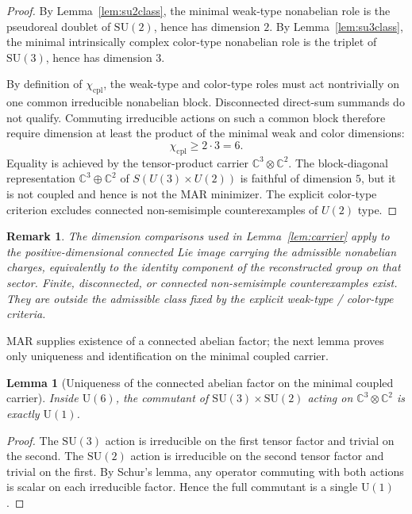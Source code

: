 \documentclass[11pt]{article}
\newtheorem{lemma}[theorem]{Lemma}
\newtheorem{remark}[theorem]{Remark}
\newcommand{\SU}{\mathrm{SU}}
\newcommand{\U}{\mathrm{U}}
\begin{document}
\begin{proof}
By Lemma~\ref{lem:su2class}, the minimal weak-type nonabelian role is the pseudoreal doublet of $\SU(2)$, hence has dimension $2$. By Lemma~\ref{lem:su3class}, the minimal intrinsically complex color-type nonabelian role is the triplet of $\SU(3)$, hence has dimension $3$.

By definition of $\chi_{\mathrm{cpl}}$, the weak-type and color-type roles must act nontrivially on one common irreducible nonabelian block. Disconnected direct-sum summands do not qualify. Commuting irreducible actions on such a common block therefore require dimension at least the product of the minimal weak and color dimensions:
\[
\chi_{\mathrm{cpl}}\ge 2\cdot 3=6.
\]
Equality is achieved by the tensor-product carrier $\mathbb C^3\otimes\mathbb C^2$. The block-diagonal representation $\mathbb C^3\oplus \mathbb C^2$ of $S(U(3)\times U(2))$ is faithful of dimension $5$, but it is not coupled and hence is not the MAR minimizer. The explicit color-type criterion excludes connected non-semisimple counterexamples of $U(2)$ type.
\end{proof}

\begin{remark}\label{rem:connectedlie}
The dimension comparisons used in Lemma~\ref{lem:carrier} apply to the positive-dimensional connected Lie image carrying the admissible nonabelian charges, equivalently to the identity component of the reconstructed group on that sector. Finite, disconnected, or connected non-semisimple counterexamples exist. They are outside the admissible class fixed by the explicit weak-type / color-type criteria.
\end{remark}

MAR supplies existence of a connected abelian factor; the next lemma proves only uniqueness and identification on the minimal coupled carrier.

\begin{lemma}[Uniqueness of the connected abelian factor on the minimal coupled carrier]\label{lem:commutant}
Inside $\U(6)$, the commutant of $\SU(3)\times\SU(2)$ acting on $\mathbb C^3\otimes \mathbb C^2$ is exactly $\U(1)$.
\end{lemma}

\begin{proof}
The $\SU(3)$ action is irreducible on the first tensor factor and trivial on the second. The $\SU(2)$ action is irreducible on the second tensor factor and trivial on the first. By Schur's lemma, any operator commuting with both actions is scalar on each irreducible factor. Hence the full commutant is a single $\U(1)$.
\end{proof}
\end{document}
